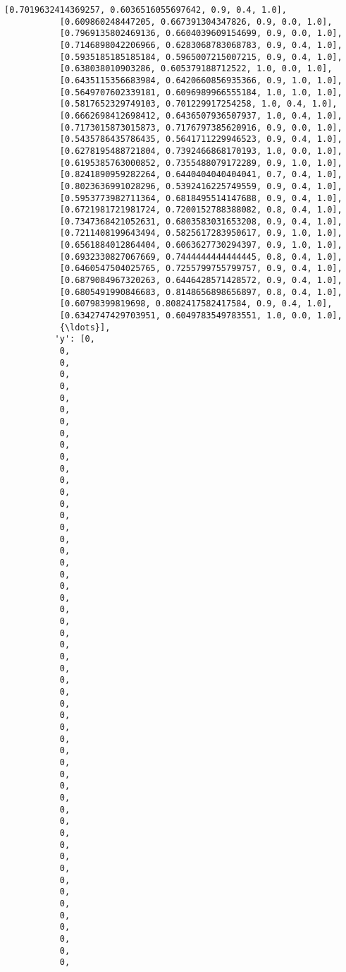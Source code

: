 \documentclass[11pt]{article}
\begin{document}
\begin{Verbatim}[commandchars=\\\{\}]
           [0.7019632414369257, 0.6036516055697642, 0.9, 0.4, 1.0],
           [0.609860248447205, 0.667391304347826, 0.9, 0.0, 1.0],
           [0.7969135802469136, 0.6604039609154699, 0.9, 0.0, 1.0],
           [0.7146898042206966, 0.6283068783068783, 0.9, 0.4, 1.0],
           [0.5935185185185184, 0.5965007215007215, 0.9, 0.4, 1.0],
           [0.638038010903286, 0.605379188712522, 1.0, 0.0, 1.0],
           [0.6435115356683984, 0.6420660856935366, 0.9, 1.0, 1.0],
           [0.5649707602339181, 0.6096989966555184, 1.0, 1.0, 1.0],
           [0.5817652329749103, 0.701229917254258, 1.0, 0.4, 1.0],
           [0.6662698412698412, 0.6436507936507937, 1.0, 0.4, 1.0],
           [0.7173015873015873, 0.7176797385620916, 0.9, 0.0, 1.0],
           [0.5435786435786435, 0.5641711229946523, 0.9, 0.4, 1.0],
           [0.6278195488721804, 0.7392466868170193, 1.0, 0.0, 1.0],
           [0.6195385763000852, 0.7355488079172289, 0.9, 1.0, 1.0],
           [0.8241890959282264, 0.6440404040404041, 0.7, 0.4, 1.0],
           [0.8023636991028296, 0.5392416225749559, 0.9, 0.4, 1.0],
           [0.5953773982711364, 0.6818495514147688, 0.9, 0.4, 1.0],
           [0.6721981721981724, 0.7200152788388082, 0.8, 0.4, 1.0],
           [0.7347368421052631, 0.6803583031653208, 0.9, 0.4, 1.0],
           [0.7211408199643494, 0.5825617283950617, 0.9, 1.0, 1.0],
           [0.6561884012864404, 0.6063627730294397, 0.9, 1.0, 1.0],
           [0.6932330827067669, 0.7444444444444445, 0.8, 0.4, 1.0],
           [0.6460547504025765, 0.7255799755799757, 0.9, 0.4, 1.0],
           [0.6879084967320263, 0.6446428571428572, 0.9, 0.4, 1.0],
           [0.6805491990846683, 0.8148656898656897, 0.8, 0.4, 1.0],
           [0.60798399819698, 0.8082417582417584, 0.9, 0.4, 1.0],
           [0.6342747429703951, 0.6049783549783551, 1.0, 0.0, 1.0],
           {\ldots}],
          'y': [0,
           0,
           0,
           0,
           0,
           0,
           0,
           0,
           0,
           0,
           0,
           0,
           0,
           0,
           0,
           0,
           0,
           0,
           0,
           0,
           0,
           0,
           0,
           0,
           0,
           0,
           0,
           0,
           0,
           0,
           0,
           0,
           0,
           0,
           0,
           0,
           0,
           0,
           0,
           0,
           0,
           0,
           0,
           0,
           0,
           0,
           0,
           0,
           0,
           0,
           0,
           0,
           0,
           0,

\end{Verbatim}
\end{document}
